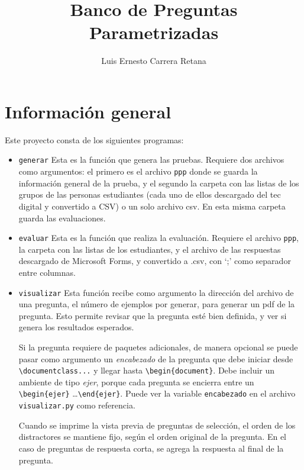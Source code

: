 \documentclass[12pt]{article}
\title{Banco de Preguntas Parametrizadas}
\author{Luis Ernesto Carrera Retana}
\theoremstyle{definition}
\begin{document}
\maketitle

\section{Información general}

Este proyecto consta de los siguientes programas:
\begin{itemize}
  \item \verb|generar| Esta es la función que genera las pruebas. Requiere dos archivos como argumentos: el primero es el archivo \verb|ppp| donde se guarda la información general de la prueba, y el segundo la carpeta con las listas de los grupos de las personas estudiantes (cada uno de ellos descargado del tec digital y convertido a CSV) o un solo archivo csv. En esta misma carpeta guarda las evaluaciones.

  \item \verb|evaluar| Esta es la función que realiza la evaluación. Requiere el archivo \verb|ppp|, la carpeta con las listas de los estudiantes, y el archivo de las respuestas descargado de Microsoft Forms, y convertido a .csv, con `;' como separador entre columnas.

  \item \verb|visualizar| Esta función recibe como argumento la dirección del archivo de una pregunta, el número de ejemplos por generar, para generar un pdf de la pregunta. Esto permite revisar que la pregunta esté bien definida, y ver si genera los resultados esperados.

    Si la pregunta requiere de paquetes adicionales, de manera opcional se puede pasar como argumento un \emph{encabezado} de la pregunta que debe iniciar desde \verb|\documentclass...| y llegar hasta \verb|\begin{document}|. Debe incluir un ambiente de tipo \emph{ejer}, porque cada pregunta se encierra entre un \verb|\begin{ejer}| \dots \verb|\end{ejer}|. Puede ver la variable \verb|encabezado| en el archivo \verb|visualizar.py| como referencia.

    Cuando se imprime la vista previa de preguntas de selecci\'on, el orden de los distractores se mantiene fijo, seg\'un el orden original de la pregunta. En el caso de preguntas de respuesta corta, se agrega la respuesta al final de la pregunta.
\end{itemize}
\end{document}
